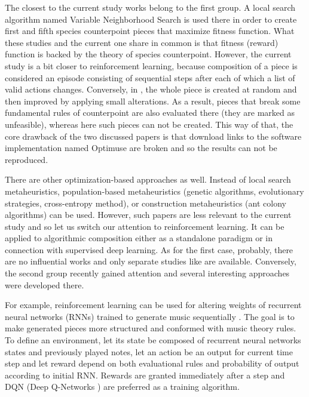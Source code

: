 \documentclass{article}
\begin{document}
The closest to the current study works \cite{herremans2012first, herremans2013fifth} belong to the first group. A local search algorithm named Variable Neighborhood Search is used there in order to create first and fifth species counterpoint pieces that maximize fitness function. What these studies and the current one share in common is that fitness (reward) function is backed by the theory of species counterpoint. However, the current study is a bit closer to reinforcement learning, because composition of a piece is considered an episode consisting of sequential steps after each of which a list of valid actions changes. Conversely, in \cite{herremans2012first, herremans2013fifth}, the whole piece is created at random and then improved by applying small alterations. As a result, pieces that break some fundamental rules of counterpoint are also evaluated there (they are marked as unfeasible), whereas here such pieces can not be created. This way of that, the core drawback of the two discussed papers is that download links to the software implementation named Optimuse are broken and so the results can not be reproduced.

There are other optimization-based approaches as well. Instead of local search metaheuristics, population-based metaheuristics (genetic algorithms, evolutionary strategies, cross-entropy method), or construction metaheuristics (ant colony algorithms) can be used. However, such papers are less relevant to the current study and so let us switch our attention to reinforcement learning. It can be applied to algorithmic composition either as a standalone paradigm or in connection with supervised deep learning. As for the first case, probably, there are no influential works and only separate studies like \cite{yi2007automatic, smith2012reinforcement} are available. Conversely, the second group recently gained attention and several interesting approaches were developed there.

For example, reinforcement learning can be used for altering weights of recurrent neural networks (RNNs) trained to generate music sequentially \cite{jaques2016generating, kotecha2018bach}. The goal is to make generated pieces more structured and conformed with music theory rules. To define an environment, let its state be composed of recurrent neural networks states and previously played notes, let an action be an output for current time step and let reward depend on both evaluational rules and probability of output according to initial RNN. Rewards are granted immediately after a step and DQN (Deep Q-Networks \cite{mnih2013playing}) are preferred as a training algorithm.
\end{document}

